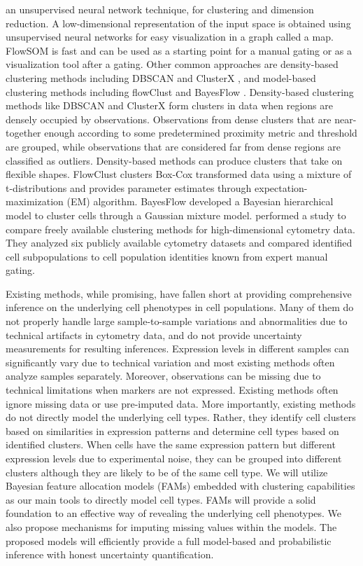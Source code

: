 \documentclass[12pt,]{article}
\begin{document}
an unsupervised neural network technique, for clustering and dimension
reduction. A low-dimensional representation of the input space is obtained
using unsupervised neural networks for easy visualization in a graph called a
map.  FlowSOM is fast and can be used as a starting point for a manual gating
or as a visualization tool after a gating.  Other common approaches are
density-based clustering methods including DBSCAN \citep{ester1996density} and
ClusterX \citep{chen2016cytofkit}, and  model-based clustering methods including
flowClust \citep{lo2009flowclust} and BayesFlow \citep{johnsson2016bayesflow}.
Density-based clustering methods like DBSCAN and ClusterX form clusters in data
when regions are densely occupied by observations. Observations from dense
clusters that are near-together enough according to some predetermined
proximity metric and threshold are grouped, while observations that are
considered far from dense regions are classified as outliers. Density-based
methods can produce clusters that take on flexible shapes. FlowClust clusters
Box-Cox transformed data using a mixture of t-distributions and provides
parameter estimates through expectation-maximization (EM) algorithm. BayesFlow
developed a Bayesian hierarchical model to cluster cells through a Gaussian
mixture model.  \cite{weber2016comparison} performed a study to compare freely
available clustering methods for high-dimensional cytometry data.  They
analyzed six publicly available cytometry datasets and compared identified cell
subpopulations to cell population identities known from expert manual gating. 


Existing methods, while promising, have fallen short at providing comprehensive
inference on the underlying cell phenotypes in cell populations.  Many of them
do not properly handle large sample-to-sample variations and abnormalities due
to technical artifacts in cytometry data, and do not provide uncertainty
measurements for resulting inferences.  Expression levels in different samples
can significantly vary due to technical variation and most existing methods
often analyze samples separately.  Moreover, observations can be missing due to
technical limitations when markers are not expressed.  Existing methods often
ignore missing data or use pre-imputed data.  More importantly, existing methods
do not directly model the underlying cell types.  Rather, they identify cell
clusters based on similarities in expression patterns and determine cell types
based on identified clusters. When cells have the same expression pattern but
different expression levels due to experimental noise, they can be grouped into
different clusters although they are likely to be of the same cell type.  We
will utilize Bayesian feature allocation models (FAMs) embedded with clustering
capabilities as our main tools to directly model cell types. FAMs will provide
a solid foundation to an effective way of revealing the underlying cell
phenotypes. We also propose mechanisms for imputing missing values within the
models. The proposed models will efficiently provide a full model-based and
probabilistic inference with honest uncertainty quantification.
\end{document}
